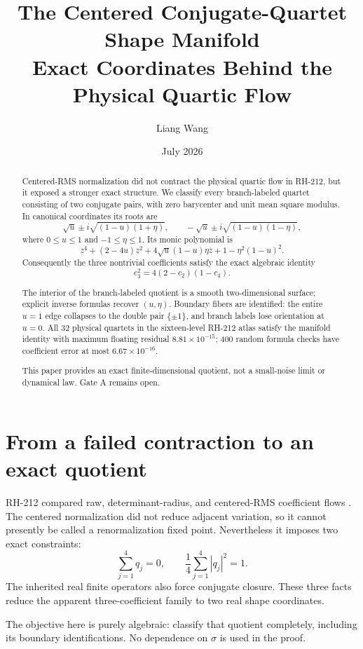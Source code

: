\documentclass[12pt]{article}
\title{The Centered Conjugate-Quartet Shape Manifold\\
\large Exact Coordinates Behind the Physical Quartic Flow}
\author{Liang Wang}\date{July 2026}
\theoremstyle{remark}\newtheorem{remark}[theorem]{Remark}
\begin{document}
\maketitle
\begin{abstract}
Centered-RMS normalization did not contract the physical quartic flow in
RH-212, but it exposed a stronger exact structure.  We classify every
branch-labeled quartet consisting of two conjugate pairs, with zero
barycenter and unit mean square modulus.  In canonical coordinates its roots
are
\[
 \sqrt u\pm i\sqrt{(1-u)(1+\eta)},\qquad
 -\sqrt u\pm i\sqrt{(1-u)(1-\eta)},
\]
where $0\le u\le1$ and $-1\le\eta\le1$.  Its monic polynomial is
\[
 z^4+(2-4u)z^2+4\sqrt u(1-u)\eta z
       +1-\eta^2(1-u)^2.
\]
Consequently the three nontrivial coefficients satisfy the exact algebraic
identity
\[
 c_3^2=4(2-c_2)(1-c_4).
\]

The interior of the branch-labeled quotient is a smooth two-dimensional
surface; explicit inverse formulas recover $(u,\eta)$.  Boundary fibers are
identified: the entire $u=1$ edge collapses to the double pair $\{\pm1\}$,
and branch labels lose orientation at $u=0$.  All 32 physical quartets in the
sixteen-level RH-212 atlas satisfy the manifold identity with maximum
floating residual $8.81\times10^{-15}$; 400 random formula checks have
coefficient error at most $6.67\times10^{-16}$.

This paper provides an exact finite-dimensional quotient, not a small-noise
limit or dynamical law.  Gate A remains open.
\end{abstract}

\section{From a failed contraction to an exact quotient}

RH-212 compared raw, determinant-radius, and centered-RMS coefficient flows
\citep{WangRH212}.  The centered normalization did not reduce adjacent
variation, so it cannot presently be called a renormalization fixed point.
Nevertheless it imposes two exact constraints:
\begin{equation}\label{eq:centerconstraints}
 \sum_{j=1}^{4}q_j=0,
 \qquad \frac14\sum_{j=1}^{4}|q_j|^2=1.
\end{equation}
The inherited real finite operators also force conjugate closure.  These
three facts reduce the apparent three-coefficient family to two real shape
coordinates.

The objective here is purely algebraic: classify that quotient completely,
including its boundary identifications.  No dependence on $\sigma$ is used
in the proof.
\end{document}
